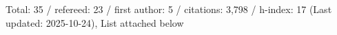 Total: 35 / refereed: 23 / first author: 5 / citations: 3,798 / h-index: 17 (Last updated: 2025-10-24), List attached below